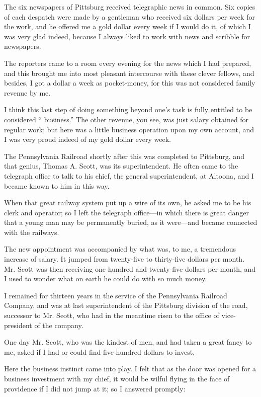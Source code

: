\documentclass[11pt,openany]{book}
\begin{document}
The six newspapers of Pittsburg received telegraphic news in common. Six copies of each despatch were made by a gentleman who received six dollars per week for the work, and he offered me a gold dollar every week if I would do it, of which I was very glad indeed, because I always liked to work with news and scribble for newspapers.

The reporters came to a room every evening for the news which I had prepared, and this brought me into most pleasant intercourse with these clever fellows, and besides, I got a dollar a week as pocket-money, for this was not considered family revenue by me.

I think this last step of doing something beyond one's task is fully entitled to be considered `` business.'' The other revenue, you see, was just salary obtained for regular work; but here was a little business operation upon my own account, and I was very proud indeed of my gold dollar every week.

The Pennsylvania Railroad shortly after this was completed to Pittsburg, and that genius, Thomas A. Scott, was its superintendent. He often came to the telegraph office to talk to his chief, the general superintendent, at Altoona, and I became known to him in this way.

When that great railway system put up a wire of its own, he asked me to be his clerk and operator; so I left the telegraph office---in which there is great danger that a young man may be permanently buried, as it were---and became connected with the railways.

The new appointment was accompanied by what was, to me, a tremendous increase of salary. It jumped from twenty-five to thirty-five dollars per month. Mr. Scott was then receiving one hundred and twenty-five dollars per month, and I used to wonder what on earth he could do with so much money.

I remained for thirteen years in the service of the Pennsylvania Railroad Company, and was at last superintendent of the Pittsburg division of the road, successor to Mr. Seott, who had in the meantime risen to the office of vice-president of the company.

One day Mr. Scott, who was the kindest of men, and had taken a great fancy to me, asked if I had or could find five hundred dollars to invest,

Here the business instinct came into play. I felt that as the door was opened for a business investment with my chief, it would be wilful flying in the face of providence if I did not jump at it; so I answered promptly:
\end{document}
